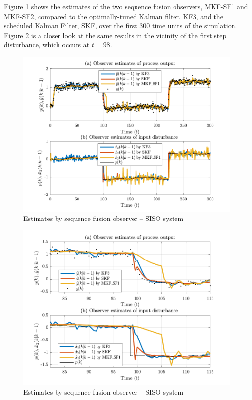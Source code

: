 Figure \ref{fig:rod-obs-sim1-yest-1-SF} shows the estimates of the two sequence fusion observers, MKF-SF1 and MKF-SF2, compared to the optimally-tuned Kalman filter, KF3, and the scheduled Kalman Filter, SKF, over the first 300 time units of the simulation. Figure \ref{fig:rod-obs-sim1-yest-2-SF} is a closer look at the same results in the vicinity of the first step disturbance, which occurs at $t=98$.
\begin{figure}[htp]
	\centering
	\includegraphics[width=12cm]{images/rod_obs_sim1_all_seed_y_est1_SF1.pdf}
	\caption{Estimates by sequence fusion observer – SISO system}
	\label{fig:rod-obs-sim1-yest-1-SF}
\end{figure}

\begin{figure}[htp]
	\centering
	\includegraphics[width=12cm]{images/rod_obs_sim1_all_seed_y_est2_SF1.pdf}
	\caption{Estimates by sequence fusion observer – SISO system}
	\label{fig:rod-obs-sim1-yest-2-SF}
\end{figure}

